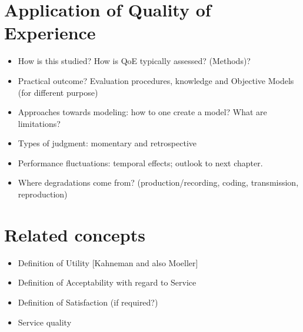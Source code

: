 \section{Application of Quality of Experience}
\begin{itemize}
\item How is this studied? How is QoE typically assessed? (Methods)? 
\item Practical outcome? Evaluation procedures, knowledge and Objective Models (for different purpose)

\item Approaches towards modeling: how to one create a model? What are limitations?
\item Types of judgment: momentary and retrospective
\item Performance fluctuations: temporal effects; outlook to next chapter.
\item Where degradations come from? (production/recording, coding, transmission, reproduction)
\end{itemize}

\section{Related concepts}
\begin{itemize}
\item Definition of Utility [Kahneman and also Moeller]
\item Definition of Acceptability with regard to Service
\item Definition of Satisfaction (if required?)
\item Service quality
\end{itemize}
